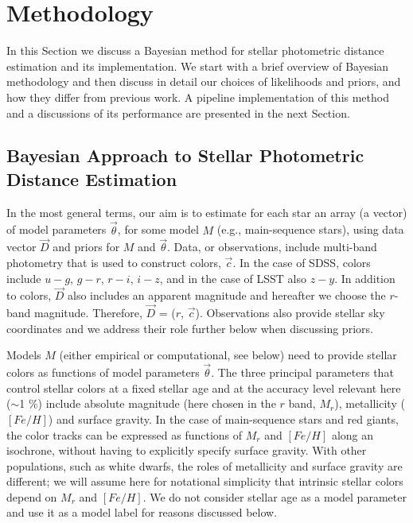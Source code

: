 
\section{Methodology}
\label{sec:method}

In this Section we discuss a Bayesian method for stellar photometric distance estimation and its implementation.
We start with a brief overview of Bayesian methodology and then discuss in detail our choices of likelihoods
and priors, and how they differ from previous work. A pipeline implementation of this method and a discussions
of its performance are presented in the next Section. 


\subsection{Bayesian Approach to Stellar Photometric Distance Estimation}

In the most general terms, our aim is to estimate for each star an array (a vector) of model parameters $\vec{\theta}$,
for some model $M$ (e.g., main-sequence stars), using data vector $\vec{D}$ and priors for $M$ and $\vec{\theta}$.
Data, or observations, include multi-band photometry that is used
to construct colors, $\vec{c}$. In the case of SDSS, colors include $u-g$, $g-r$, $r-i$, $i-z$, and in the case of LSST also
$z-y$. In addition to colors, $\vec{D}$ also includes an apparent magnitude and hereafter we choose the $r$-band
magnitude. Therefore, $\vec{D}$ = ($r$, $\vec{c}$). Observations also provide stellar sky coordinates and we
address their role further below when discussing priors.

Models $M$ (either empirical or computational, see below) need to provide stellar colors as functions of model parameters
$\vec{\theta}$. 
The three principal parameters that control stellar colors at a fixed stellar age and at the accuracy level relevant here
($\sim$1 \%) include absolute magnitude (here chosen in the $r$ band, $M_r$), metallicity ($[Fe/H]$) and surface
gravity. In the case of main-sequence stars and red giants, the color tracks can be expressed as functions of $M_r$
and $[Fe/H]$ along an isochrone, without having to explicitly specify surface gravity. With other populations,
such as white dwarfs, the roles of metallicity and surface gravity are different; we will
assume here for notational simplicity that intrinsic stellar colors depend on $M_r$ and $[Fe/H]$. We do not
consider stellar age as a model parameter and use it as a model label for reasons discussed below.  

